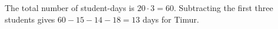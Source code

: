 The total number of student-days is $20\cdot3=60$. Subtracting the first three students gives $60-15-14-18=\boxed{13}$ days for Timur.

